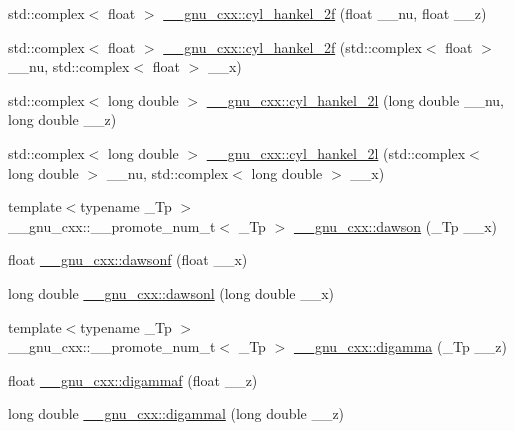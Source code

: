 \begin{DoxyCompactItemize}
\item 
std\+::complex$<$ float $>$ \hyperlink{group__gnu__math__spec__func_ga2b75361870975c47d57bed71b4064ce7}{\+\_\+\+\_\+gnu\+\_\+cxx\+::cyl\+\_\+hankel\+\_\+2f} (float \+\_\+\+\_\+nu, float \+\_\+\+\_\+z)
\item 
std\+::complex$<$ float $>$ \hyperlink{group__gnu__math__spec__func_gae21f9d09b937eaf9729982da5a382f20}{\+\_\+\+\_\+gnu\+\_\+cxx\+::cyl\+\_\+hankel\+\_\+2f} (std\+::complex$<$ float $>$ \+\_\+\+\_\+nu, std\+::complex$<$ float $>$ \+\_\+\+\_\+x)
\item 
std\+::complex$<$ long double $>$ \hyperlink{group__gnu__math__spec__func_ga4babb91ca6906f237e8bd1f0f1a10509}{\+\_\+\+\_\+gnu\+\_\+cxx\+::cyl\+\_\+hankel\+\_\+2l} (long double \+\_\+\+\_\+nu, long double \+\_\+\+\_\+z)
\item 
std\+::complex$<$ long double $>$ \hyperlink{group__gnu__math__spec__func_ga1ac6434925254bd02e108f5a4e52b34d}{\+\_\+\+\_\+gnu\+\_\+cxx\+::cyl\+\_\+hankel\+\_\+2l} (std\+::complex$<$ long double $>$ \+\_\+\+\_\+nu, std\+::complex$<$ long double $>$ \+\_\+\+\_\+x)
\item 
{\footnotesize template$<$typename \+\_\+\+Tp $>$ }\\\+\_\+\+\_\+gnu\+\_\+cxx\+::\+\_\+\+\_\+promote\+\_\+num\+\_\+t$<$ \+\_\+\+Tp $>$ \hyperlink{group__gnu__math__spec__func_ga30e46cb24428cfdb858c52fec431dee4}{\+\_\+\+\_\+gnu\+\_\+cxx\+::dawson} (\+\_\+\+Tp \+\_\+\+\_\+x)
\item 
float \hyperlink{group__gnu__math__spec__func_ga0a1b8e6760b8c7869127d41d96209318}{\+\_\+\+\_\+gnu\+\_\+cxx\+::dawsonf} (float \+\_\+\+\_\+x)
\item 
long double \hyperlink{group__gnu__math__spec__func_ga6647a7444ff9c7c1f2a8ed36761bfeb2}{\+\_\+\+\_\+gnu\+\_\+cxx\+::dawsonl} (long double \+\_\+\+\_\+x)
\item 
{\footnotesize template$<$typename \+\_\+\+Tp $>$ }\\\+\_\+\+\_\+gnu\+\_\+cxx\+::\+\_\+\+\_\+promote\+\_\+num\+\_\+t$<$ \+\_\+\+Tp $>$ \hyperlink{group__gnu__math__spec__func_ga6c698fd735df9d76905e2cad97f2316a}{\+\_\+\+\_\+gnu\+\_\+cxx\+::digamma} (\+\_\+\+Tp \+\_\+\+\_\+z)
\item 
float \hyperlink{group__gnu__math__spec__func_gadb2a40ca78a0d909126734c75eabd86f}{\+\_\+\+\_\+gnu\+\_\+cxx\+::digammaf} (float \+\_\+\+\_\+z)
\item 
long double \hyperlink{group__gnu__math__spec__func_gae081ad08e1a42ffaad63b87b9f579dcf}{\+\_\+\+\_\+gnu\+\_\+cxx\+::digammal} (long double \+\_\+\+\_\+z)

\end{DoxyCompactItemize}
